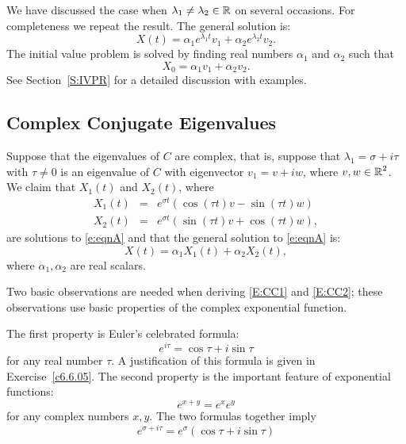 \documentclass{ximera}
\begin{document}
We have discussed the case when $\lambda_1\neq\lambda_2\in\mbox{$\mathbb{R}$}$ on several
occasions.  For completeness we repeat the result.  The general solution is:
\begin{equation}  \label{E:RD2}
X(t) = \alpha_1 e^{\lambda_1 t}v_1 + \alpha_2 e^{\lambda_2 t}v_2.
\end{equation}
The initial value problem is solved by finding real numbers $\alpha_1$ and
$\alpha_2$ such that
\[
X_0 = \alpha_1 v_1 + \alpha_2 v_2.
\]
See Section~\ref{S:IVPR} for a detailed discussion with examples.

\subsection*{Complex Conjugate Eigenvalues}

Suppose that the eigenvalues of $C$ are complex, that is, suppose that
$\lambda_1= \sigma+i\tau$ with $\tau\neq 0$ is an eigenvalue of $C$ with
eigenvector $v_1=v+iw$, where $v,w\in\mbox{$\mathbb{R}$}^2$.  We claim that
$X_1(t)$ and $X_2(t)$, where
\begin{equation}  \label{E:CC1}
\begin{array}{rcl}
X_1(t) & = & e^{\sigma t}(\cos(\tau t)v -\sin(\tau t)w)\\
X_2(t) & = & e^{\sigma t}(\sin(\tau t)v +\cos(\tau t)w),
\end{array}
\end{equation}
are solutions to \eqref{e:eqnA} and that the general
solution to \eqref{e:eqnA} is:
\begin{equation}  \label{E:CC2}
X(t) = \alpha_1 X_1(t) + \alpha_2 X_2(t),
\end{equation}
where $\alpha_1, \alpha_2$ are real scalars.

Two basic observations are needed when deriving \eqref{E:CC1} and \eqref{E:CC2}; these
observations use basic properties of the complex exponential function.

The first property is Euler's celebrated formula:
\begin{equation}  \label{E:Euler}
e^{i\tau} = \cos\tau + i\sin\tau
\end{equation}
for any real number $\tau$.  A justification of this formula is given in Exercise~\ref{c6.6.05}.   
The second property is the important feature of exponential functions:
\begin{equation} \label{e:complex_homo}
e^{x+y} = e^x e^y
\end{equation}
for any complex numbers $x, y$.
The two formulas together imply
\begin{equation} \label{e:complex_exp}
e^{\sigma+i\tau} = e^\sigma(\cos \tau + i \sin\tau)
\end{equation} 
\end{document}
